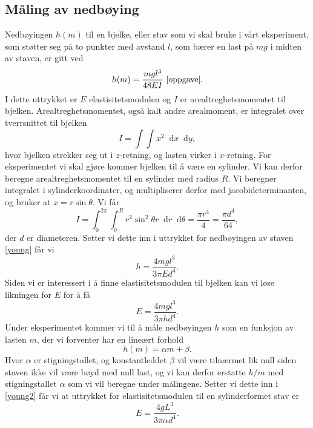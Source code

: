 \documentclass[%
 reprint,
 amsmath,amssymb,
 aps,
 norsk,
 booktabs
]{revtex4-1}
\newcommand*\diff{\mathop{}\!\mathrm{d}}
\begin{document}
\subsection{Måling av nedbøying}
Nedbøyingen $h(m)$ til en bjelke, eller stav som vi skal bruke i vårt eksperiment, som støtter seg på to punkter med avstand $l$, som bærer en last på $mg$ i midten av staven, er gitt ved
\begin{equation}
  h(m) = \frac{mgl^3}{48EI} \,\,\label{young} \cite{oppgave}.
\end{equation}
I dette uttrykket er $E$ elastisitetsmodulen og $I$ er arealtreghetsmomentet til bjelken. Arealtreghetsmomentet, også kalt andre arealmoment, er integralet over tverrsnittet til bjelken
\begin{equation*}
  I = \int\int x^2 \diff x \diff y,
\end{equation*}hvor bjelken strekker seg ut i $z$-retning, og lasten virker i $x$-retning. For eksperimentet vi skal gjøre kommer bjelken til å være en sylinder. Vi kan derfor beregne arealtreghetsmomentet til en sylinder med radius $R$. Vi beregner integralet i sylinderkoordinater, og multipliserer derfor med jacobideterminanten, og bruker at $x = r\sin{\theta}$. Vi får
\begin{equation*}
  I = \int_0^{2\pi} \int_0^R r^2\sin^2{\theta}r \diff r \diff \theta = \frac{\pi r^4}{4} = \frac{\pi d^4}{64},
\end{equation*}
der $d$ er diameteren. Setter vi dette inn i  uttrykket for nedbøyingen av staven \eqref{young} får vi
\begin{equation*}
  h = \frac{4mgl^3}{3\pi Ed^4}.
\end{equation*}
Siden vi er interessert i å finne elastisitetsmodulen til bjelken kan vi løse likningen for $E$ for å få
\begin{equation}
  E = \frac{4mgl^3}{3\pi hd^4}. \label{young2}
\end{equation}
Under eksperimentet kommer vi til å måle nedbøyingen $h$ som en funksjon av lasten $m$, der vi forventer har en lineært forhold
\begin{equation*}
  h(m) = \alpha m + \beta.
\end{equation*}
Hvor $\alpha$ er stigningstallet, og konstantleddet $\beta$ vil være tilnærmet lik null siden staven ikke vil være bøyd med null last, og vi kan derfor erstatte $h/m$ med stigningstallet $\alpha$ som vi vil beregne under målingene. Setter vi dette inn i \eqref{young2} får vi at uttrykket for elastisitetsmodulen til en sylinderformet stav er
\begin{equation}
  E = \frac{4gL^3}{3\pi \alpha d^4}. \label{young3}
\end{equation}
\end{document}
